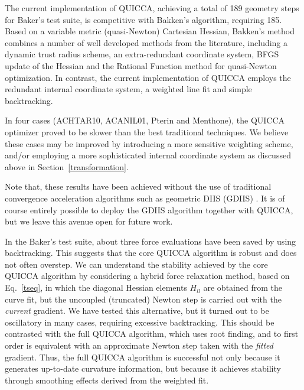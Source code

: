 \documentclass[prl,twocolumn,showpacs,twocolumngrid,superbib]{revtex4}
\begin{document}
The current implementation of QUICCA, achieving a total of 189 geometry steps for Baker's test suite, is 
competitive with Bakken's algorithm, requiring 185.  Based on a variable metric (quasi-Newton) 
Cartesian Hessian, Bakken's method combines a number of well developed methods from the literature, 
including a dynamic trust radius scheme,  an extra-redundant coordinate system, BFGS update of 
the Hessian and the Rational Function method for quasi-Newton optimization.  In contrast, the
current implementation of QUICCA employs the redundant internal coordinate system, a weighted line
fit and simple backtracking.  

In four cases (ACHTAR10, ACANIL01, Pterin and Menthone), the QUICCA optimizer proved to be slower 
than the best traditional techniques.   We believe these cases may be improved by introducing a
more sensitive weighting scheme, and/or employing a more sophisticated internal coordinate
system as discussed above in Section~\ref{transformation}.

Note that, these results have been achieved without the use of traditional convergence acceleration 
algorithms such as geometric DIIS (GDIIS) \cite{Pulay_GDIIS,Farkas_GDIIS}.  It is of course entirely 
possible to deploy the GDIIS algorithm together with QUICCA, but we leave this avenue open for future 
work.

In the Baker's test suite, about three force evaluations have been saved by 
using backtracking.  This suggests that the core QUICCA algorithm is robust and
does not often overstep.  We can understand the stability achieved by the core QUICCA
algorithm by considering a hybrid force relaxation method, based on Eq.~\ref{tseq},
in which the diagonal Hessian elements $H_{ll}$ are obtained from the 
curve fit, but the uncoupled (truncated) Newton step is carried out with the {\em current} 
gradient.  We have tested this alternative, but it turned out to be oscillatory 
in many cases, requiring excessive backtracking.  This should be contrasted with the
full QUICCA algorithm, which uses root finding, and to first order is equivalent with 
an approximate Newton step taken with the {\em fitted} gradient.   Thus, the full 
QUICCA algorithm is successful not only because it generates up-to-date curvature information, 
but because it achieves stability through smoothing effects derived from the weighted fit.
\end{document}
